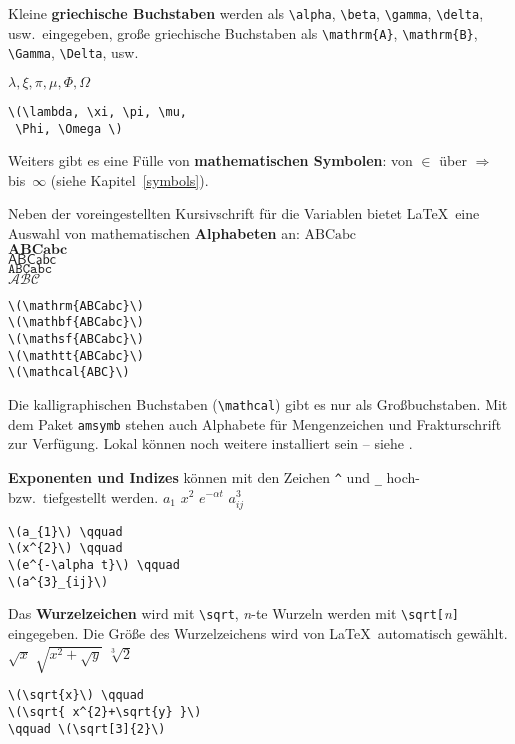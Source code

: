 Kleine \textbf{griechische Buchstaben} werden als \verb|\alpha|,
\verb|\beta|, \verb|\gamma|, \verb|\delta|, usw.\ eingegeben,
große griechische Buchstaben als \verb|\mathrm{A}|,
\verb|\mathrm{B}|, \verb|\Gamma|, \verb|\Delta|, usw.

\exa
\(\lambda, \xi, \pi, \mu,
 \Phi, \Omega \)
\exb
\begin{verbatim}
\(\lambda, \xi, \pi, \mu,
 \Phi, \Omega \)
\end{verbatim}
\exc
 
Weiters gibt es eine Fülle von \textbf{mathematischen Symbolen}:
von \(\in\) über \(\Rightarrow\) bis~\(\infty\) (siehe
Kapitel~\ref{symbols}).
 
\bigskip

Neben der voreingestellten Kursivschrift für die Variablen
bietet \LaTeX\ eine Auswahl von mathematischen \textbf{Alphabeten} an:
\exa
\(\mathrm{ABCabc}\) \\
\(\mathbf{ABCabc}\) \\
\(\mathsf{ABCabc}\) \\
\(\mathtt{ABCabc}\) \\
\(\mathcal{ABC}\)
\exb
\begin{verbatim}
\(\mathrm{ABCabc}\)
\(\mathbf{ABCabc}\)
\(\mathsf{ABCabc}\)
\(\mathtt{ABCabc}\)
\(\mathcal{ABC}\)
\end{verbatim}
\exc
Die kalligraphischen Buchstaben (\verb:\mathcal:) gibt es nur als
Großbuchstaben. Mit dem Paket \texttt{amsymb} \cite{ch8} stehen
auch Alphabete für Mengenzeichen und Frakturschrift zur Verfügung.
Lokal können noch weitere installiert sein -- siehe \local.


\bigskip

\textbf{Exponenten und Indizes} können mit den Zeichen \verb|^|
und \verb|_| hoch- bzw.\ tiefgestellt werden.
\exa
\(a_{1}\) \qquad
\(x^{2}\) \qquad
\(e^{-\alpha t}\) \qquad
\(a^{3}_{ij}\)
\exb
\begin{verbatim}
\(a_{1}\) \qquad
\(x^{2}\) \qquad
\(e^{-\alpha t}\) \qquad
\(a^{3}_{ij}\)
\end{verbatim}
\exc
 
Das \textbf{Wurzelzeichen} wird mit \verb|\sqrt|, \textit{n}-te
Wurzeln werden mit \verb|\sqrt[|\textit{n}\verb|]| eingegeben.
Die Größe des Wurzelzeichens wird von \LaTeX\ automatisch
gewählt.
\exa
\(\sqrt{x}\) \qquad
\(\sqrt{ x^{2}+\sqrt{y} }\)
\qquad \(\sqrt[3]{2}\)
\exb
\begin{verbatim}
\(\sqrt{x}\) \qquad
\(\sqrt{ x^{2}+\sqrt{y} }\)
\qquad \(\sqrt[3]{2}\)
\end{verbatim}
\exc
 
